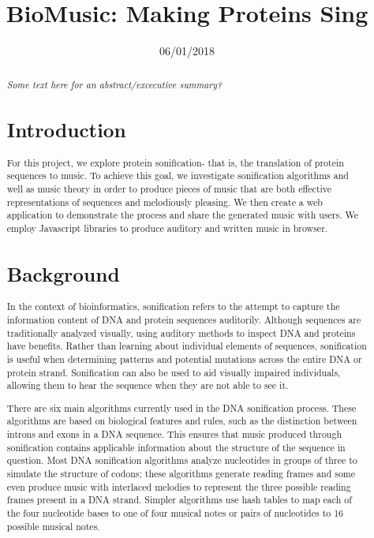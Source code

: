 \documentclass[11pt,a4paper]{article}
\title{BioMusic: Making Proteins Sing}
\date{06/01/2018}
\begin{document}
\maketitle
\begin{abstract}
  \textit{Some text here for an abstract/excecutive summary?}

\section{Introduction}

For this project, we explore protein sonification- that is, the translation of protein sequences to music. To achieve this goal, we investigate sonification algorithms and well as music theory in order to produce pieces of music that are both effective representations of sequences and melodiously pleasing. We then create a web application to demonstrate the process and share the generated music with users. We employ Javascript libraries to produce auditory and written music in browser. 

\section{Background}

In the context of bioinformatics, sonification refers to the attempt to capture the information content of DNA and protein sequences auditorily. Although sequences are traditionally analyzed visually, using auditory methods to inspect DNA and proteins have benefits. Rather than learning about individual elements of sequences, sonification is useful when determining patterns and potential mutations across the entire DNA or protein strand. Sonification can also be used to aid visually impaired individuals, allowing them to hear the sequence when they are not able to see it. 

There are six main algorithms currently used in the DNA sonification process. These algorithms are based on biological features and rules, such as the distinction between introns and exons in a DNA sequence. This ensures that music produced through sonification contains applicable information about the structure of the sequence in question.  Most DNA sonification algorithms analyze nucleotides in groups of three to simulate the structure of codons; these algorithms generate reading frames and some even produce music with interlaced melodies to represent the three possible reading frames present in a DNA strand. Simpler algorithms use hash tables to map each of the four nucleotide bases to one of four musical notes or pairs of nucleotides to 16 possible musical notes. 


\end{abstract}
\end{document}
